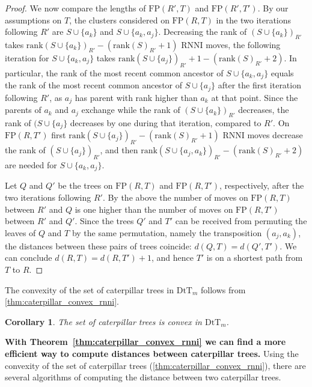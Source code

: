 \documentclass[11pt]{amsart}
\newtheorem{corollary}{Corollary}
\newcommand{\rnni}{\mathrm{RNNI}}
\newcommand{\rank}{\mathrm{rank}}
\newcommand{\fp}{\mathrm{FP}}
\newcommand{\dtt}{\mathrm{DtT}}
\newcommand{\summary}[1]{\textbf{#1}} %
\begin{document}
\begin{proof}
	We now compare the lengths of $\fp(R',T)$ and $\fp(R',T')$.
	By our assumptions on $T$, the clusters considered on $\fp(R,T)$ in the two iterations following $R'$ are $S \cup \{a_k\}$ and $S \cup \{a_k, a_j\}$.
	Decreasing the rank of $(S \cup \{a_k\})_{R'}$ takes $\rank(S \cup \{a_k\})_{R'} - (\rank(S)_{R'} + 1)$ $\rnni$ moves, the following iteration for $S \cup \{a_k, a_j\}$ takes $\rank(S \cup \{a_j\})_{R'} + 1 - (\rank(S)_{R'} + 2)$.
	In particular, the rank of the most recent common ancestor of $S \cup \{a_k, a_j\}$ equals the rank of the most recent common ancestor of $S \cup \{a_j\}$ after the first iteration following $R'$, as $a_j$ has parent with rank higher than $a_k$ at that point.
	Since the parents of $a_k$ and $a_j$ exchange while the rank of $(S \cup \{a_k\})_{R'}$ decreases, the rank of $(S \cup \{a_j\}$ decreases by one during that iteration, compared to $R'$.
	On $\fp(R,T')$ first $\rank(S \cup \{a_j\})_{R'} - (\rank(S)_{R'} + 1)$ $\rnni$ moves decrease the rank of $(S \cup \{a_j\})_{R'}$, and then $\rank(S \cup \{a_j, a_k\})_{R'} - (\rank(S)_{R'} + 2)$ are needed for $S \cup \{a_k, a_j\}$.

	Let $Q$ and $Q'$ be the trees on $\fp(R,T)$ and $\fp(R,T')$, respectively, after the two iterations following $R'$.
	By the above the number of moves on $\fp(R,T)$ between $R'$ and $Q$ is one higher than the number of moves on $\fp(R,T')$ between $R'$ and $Q'$.
	Since the trees $Q'$ and $T'$ can be received from permuting the leaves of $Q$ and $T$ by the same permutation, namely the transposition $(a_j, a_k)$, the distances between these pairs of trees coincide: $d(Q,T) = d(Q',T')$.
	We can conclude $d(R,T) = d(R,T') + 1$, and hence $T'$ is on a shortest path from $T$ to $R$.
\end{proof}

The convexity of the set of caterpillar trees in $\dtt_m$ follows from \autoref{thm:caterpillar_convex_rnni}.

\begin{corollary}
	The set of caterpillar trees is convex in $\dtt_m$.
	\label{cor:caterpillar_convex_dtt}
\end{corollary}

\summary{With Theorem~\ref{thm:caterpillar_convex_rnni} we can find a more efficient way to compute distances between caterpillar trees.}
Using the convexity of the set of caterpillar trees (\autoref{thm:caterpillar_convex_rnni}), there are several algorithms of computing the distance between two caterpillar trees.
\end{document}

